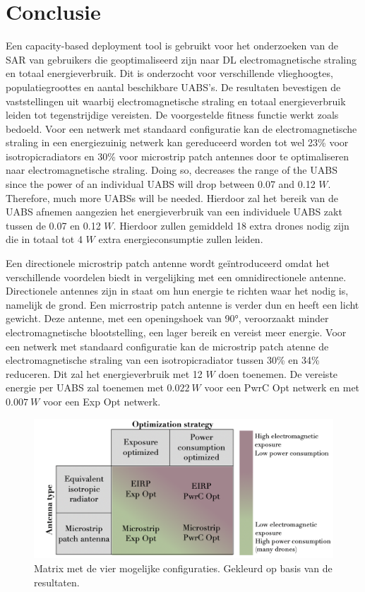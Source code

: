 \documentclass[twocolumn]{phdsymp_dutch}
\begin{document}
\FloatBarrier
\section{Conclusie}

Een capacity-based deployment tool is gebruikt voor het onderzoeken van de 
\gls{SAR} van gebruikers die geoptimaliseerd zijn naar 
 \gls{DL} electromagnetische straling en totaal energieverbruik.
 Dit is onderzocht voor verschillende vlieghoogtes, populatiegroottes en aantal beschikbare \gls{UABS}'s.
De resultaten bevestigen de vaststellingen uit \cite{J1}  waarbij electromagnetische straling en totaal energieverbruik
leiden tot tegenstrijdige vereisten. De voorgestelde fitness functie werkt zoals bedoeld.
Voor een netwerk met standaard configuratie kan de electromagnetische straling in een 
energiezuinig netwerk kan gereduceerd worden tot wel 
23\% voor \gls{isotropicradiator}s en 30\% voor microstrip patch antennes
door te optimaliseren naar electromagnetische straling. 
Doing so, decreases the range of the \gls{UABS}  since the power of an individual \gls{UABS} will 
drop between 0.07 and 0.12 $W$. Therefore, much more \gls{UABS}s will be needed. 
Hierdoor zal het bereik van de 
 \gls{UABS} afnemen aangezien het energieverbruik van een individuele \gls{UABS} zakt tussen de 
 0.07 en 0.12 $W$. Hierdoor zullen 
gemiddeld 18 extra drones nodig zijn die in totaal tot 4 $W$  extra energieconsumptie zullen leiden.

Een directionele microstrip patch antenne wordt geïntroduceerd omdat het verschillende voordelen biedt 
in vergelijking met een omnidirectionele antenne. Directionele antennes zijn in staat om hun energie te richten waar het nodig is, namelijk de grond.
Een micrrostrip patch antenne is verder dun en heeft een licht gewicht. Deze antenne, met een openingshoek van \ang{90}, veroorzaakt 
minder electromagnetische blootstelling, een lager bereik en vereist meer energie.
Voor een netwerk met standaard configuratie kan de microstrip patch atenne de electromagnetische
straling van een \gls{isotropicradiator} tussen 30\% en 34\% reduceren. Dit zal het energieverbruik met 12 $W$ doen toenemen.
De vereiste energie per \gls{UABS} zal  toenemen met $0.022\ W$ voor een \gls{PwrC Opt} netwerk en met 
$0.007\ W$ voor een \gls{Exp Opt} netwerk.
\begin{figure}[hb!]
\centering
  \includegraphics[width=0.8\linewidth]{../images/fourCasesMatrixSol.png}
  \caption{Matrix met de vier mogelijke configuraties. Gekleurd op basis van de resultaten.}
  \label{fig:resultIllustration}
\end{figure}
\end{document}
